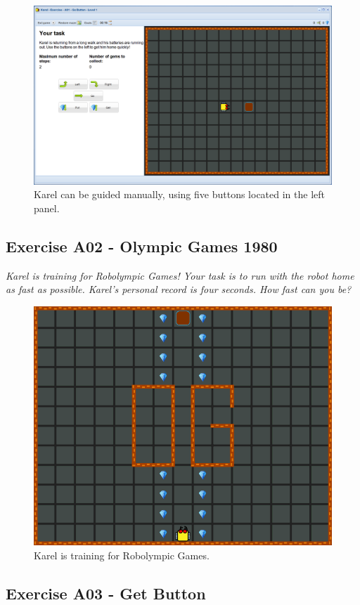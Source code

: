 \documentclass[article,A4,12pt]{llncs}
\begin{document}
\begin{figure}[!ht]
\begin{center}
\includegraphics[height=0.4\textwidth]{img/a01b.png}
\end{center}
\vspace{-4mm}
\caption{Karel can be guided manually, using five buttons located in the left panel.}
\label{fig:a01b}
\end{figure}


\subsection{Exercise A02 - Olympic Games 1980}

{\em Karel is training for Robolympic Games! Your task is to run with 
the robot home as fast as possible. Karel's personal record is four seconds. How fast can you be?}

\begin{figure}[!ht]
\begin{center}
\includegraphics[height=0.4\textwidth]{img/a02.png}
\end{center}
\vspace{-4mm}
\caption{Karel is training for Robolympic Games.}
\label{fig:a02}
\vspace{-4mm}
\end{figure}
\noindent

\subsection{Exercise A03 - Get Button}
\end{document}
